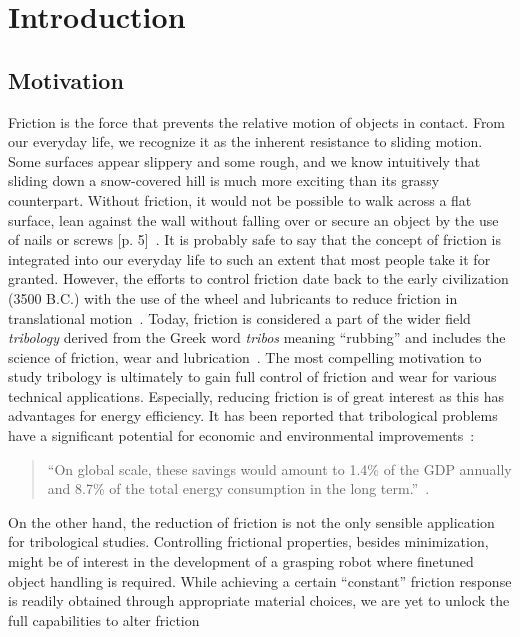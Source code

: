 \chapter{Introduction}


\section{Motivation}
Friction is the force that prevents the relative motion of objects in contact. From our everyday life, we recognize it as the inherent resistance to sliding
motion. Some surfaces appear slippery and some rough, and we know intuitively
that sliding down a snow-covered hill is much more exciting than its grassy
counterpart. Without friction, it would not be possible to walk across a flat
surface, lean against the wall without falling over or secure an object by the
use of nails or screws [p. 5]~\cite{gnecco_meyer_2015}. It is probably safe to
say that the concept of friction is integrated into our everyday life to such an
extent that most people take it for granted. However, the efforts to control
friction date back to the early civilization (3500 B.C.) with the use of the
wheel and lubricants to reduce friction in translational motion~\cite{bhushan_2013}. Today, friction is considered a part of the wider field
\textit{tribology} derived from the Greek word \textit{tribos} meaning
``rubbing'' and includes the science of friction, wear and lubrication~\cite{bhushan_2013}. The most compelling motivation to study tribology is
ultimately to gain full control of friction and wear for various technical
applications. Especially, reducing friction is of great interest as this has advantages for energy efficiency. It has been reported that
tribological problems have a significant potential for economic and
environmental improvements~\cite{kim_nano-scale_2009}:
\begin{quote}
    ``On global scale, these savings would amount to 1.4\% of the GDP annually
    and 8.7\% of the total energy consumption in the long term.''~\cite{holmberg_influence_2017}. 
\end{quote}
On the other hand, the reduction of friction is not the only sensible
application for tribological studies. Controlling frictional properties, besides
minimization, might be of interest in the development of a grasping robot where
finetuned object handling is required. While achieving a certain ``constant''
friction response is readily obtained through appropriate material choices, we are yet to unlock the full capabilities to alter friction
